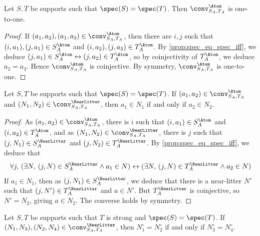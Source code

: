 \begin{proposition}
  \label{prop:conv_one_to_one}
  Let \( S, T \) be supports such that \( \spec(S) = \spec(T) \).
  Then \( \conv_{S_A, T_A}^\Atom \) is one-to-one.
\end{proposition}
\begin{proof}
  If \( (a_1, a_2), (a_1, a_3) \in \conv_{S_A, T_A}^\Atom \), then there are \( i, j \) such that \( (i, a_1), (j, a_1) \in S_A^\Atom \) and \( (i, a_2), (j, a_3) \in T_A^\Atom \).
  By \cref{prop:spec_eq_spec_iff}, we deduce \( (j, a_1) \in S_A^\Atom \leftrightarrow (j, a_2) \in T_A^\Atom \), so by coinjectivity of \( T_A^\Atom \), we deduce \( a_2 = a_3 \).
  Hence \( \conv_{S_A, T_A}^\Atom \) is coinjective.
  By symmetry, \( \conv_{S_A, T_A}^\Atom \) is one-to-one.
\end{proof}
\begin{proposition}
  \label{prop:conv_mem_nearLitter_iff}
  Let \( S, T \) be supports such that \( \spec(S) = \spec(T) \).
  If \( (a_1, a_2) \in \conv_{S_A, T_A}^\Atom \) and \( (N_1, N_2) \in \conv_{S_A, T_A}^\NearLitter \), then \( a_1 \in N_1 \) if and only if \( a_2 \in N_2 \).
\end{proposition}
\begin{proof}
  As \( (a_1, a_2) \in \conv_{S_A, T_A}^\Atom \), there is \( i \) such that \( (i, a_1) \in S_A^\Atom \) and \( (i, a_2) \in T_A^\Atom \), and as \( (N_1, N_2) \in \conv_{S_A, T_A}^\NearLitter \), there is \( j \) such that \( (j, N_1) \in S_A^\NearLitter \) and \( (j, N_2) \in T_A^\NearLitter \).
  By \cref{prop:spec_eq_spec_iff}, we deduce that
  \[ \forall j,\, (\exists N,\, (j, N) \in S_A^\NearLitter \wedge a_1 \in N) \leftrightarrow (\exists N,\, (j, N) \in T_A^\NearLitter \wedge a_2 \in N) \]
  If \( a_1 \in N_1 \), then as \( (j, N_1) \in S_A^\NearLitter \), we deduce that there is a near-litter \( N' \) such that \( (j, N') \in T_A^\NearLitter \) and \( a \in N' \).
  But \( T_A^\NearLitter \) is coinjective, so \( N' = N_2 \), giving \( a \in N_2 \).
  The converse holds by symmetry.
\end{proof}
\begin{proposition}
  \label{prop:conv_circ_eq_circ_iff}
  Let \( S, T \) be supports such that \( T \) is strong and \( \spec(S) = \spec(T) \).
  If \( (N_1, N_3), (N_2, N_4) \in \conv_{S_A, T_A}^\NearLitter \), then \( N_1^\circ = N_2^\circ \) if and only if \( N_3^\circ = N_4^\circ \).
\end{proposition}
